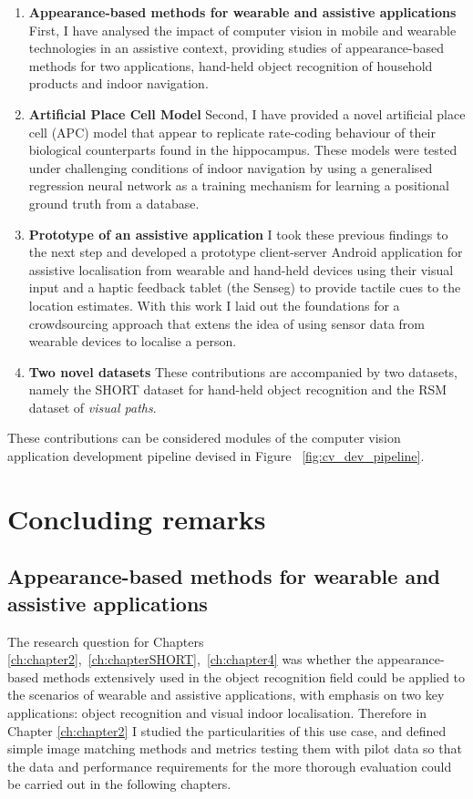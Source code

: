 \begin{enumerate}
\item \textbf{Appearance-based methods for wearable and assistive applications} First, I have analysed the impact of computer vision in mobile and wearable technologies in an assistive context, providing studies of appearance-based methods for two applications, hand-held object recognition of household products and indoor navigation.

\item \textbf{Artificial Place Cell Model} Second, I have provided a novel artificial place cell (APC) model that appear to replicate rate-coding behaviour of their biological counterparts found in the hippocampus. These models were tested under challenging conditions of indoor navigation by using a generalised regression neural network as a training mechanism for learning a positional ground truth from a database.

\item \textbf{Prototype of an assistive application} I took these previous findings to the next step and developed a prototype client-server Android application for assistive localisation from wearable and hand-held devices using their visual input and a haptic feedback tablet (the Senseg\texttrademark) to provide tactile cues to the location estimates. With this work I laid out the foundations for a crowdsourcing approach that extens the idea of using sensor data from wearable devices to localise a person.

\item \textbf{Two novel datasets} These contributions are accompanied by two datasets, namely the SHORT dataset for hand-held object recognition and the RSM dataset of \emph{visual paths}.
\end{enumerate}

These contributions can be considered modules of the computer vision application development pipeline devised in Figure ~\ref{fig:cv_dev_pipeline}.

\section{Concluding remarks}

\subsection{Appearance-based methods for wearable and assistive applications}

The research question for Chapters \ref{ch:chapter2},~\ref{ch:chapterSHORT},~\ref{ch:chapter4} was whether the appearance-based methods extensively used in the object recognition field could be applied to the scenarios of wearable and assistive applications, with emphasis on two key applications: object recognition and visual indoor localisation. Therefore in Chapter \ref{ch:chapter2} I studied the particularities of this use case, and defined simple image matching methods and metrics testing them with pilot data so that the data and performance requirements for the more thorough evaluation could be carried out in the following chapters.

